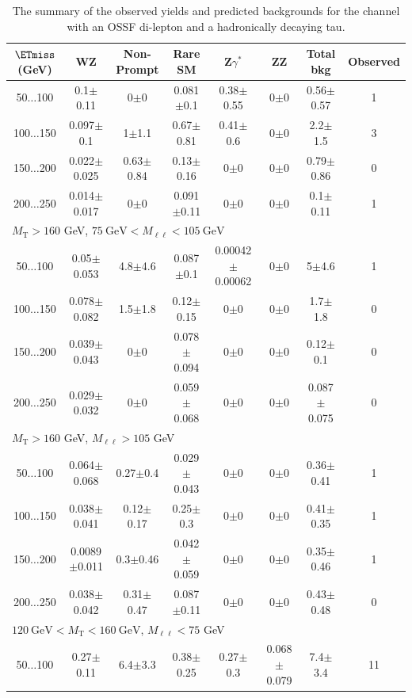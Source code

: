 \begin{table}
\scriptsize
\begin{center}
\caption{\label{tab:OSSF1tau1} The summary of the observed yields and predicted backgrounds for the channel 
with an OSSF di-lepton and a hadronically decaying tau. }
\begin{tabular}{| c | c c c c c c c | }\hline\hline
$\ETmiss$ (GeV) & WZ & Non-Prompt & Rare SM & Z$\gamma^*$ & ZZ & Total bkg & Observed\\\hline\hline
50$\dots$100&0.1$\pm$0.11&0$\pm$0&0.081$\pm$0.1&0.38$\pm$0.55&0$\pm$0&0.56$\pm$0.57&1\\
100$\dots$150&0.097$\pm$0.1&1$\pm$1.1&0.67$\pm$0.81&0.41$\pm$0.6&0$\pm$0&2.2$\pm$1.5&3\\
150$\dots$200&0.022$\pm$0.025&0.63$\pm$0.84&0.13$\pm$0.16&0$\pm$0&0$\pm$0&0.79$\pm$0.86&0\\
200$\dots$250&0.014$\pm$0.017&0$\pm$0&0.091$\pm$0.11&0$\pm$0&0$\pm$0&0.1$\pm$0.11&1\\
\hline\hline
\multicolumn{8}{l}{$M_{\text{T}} > 160$ GeV, $75~\mathrm{GeV} < M_{\ell\ell} < 105~\mathrm{GeV}$}\\\hline\hline
50$\dots$100&0.05$\pm$0.053&4.8$\pm$4.6&0.087$\pm$0.1&0.00042$\pm$0.00062&0$\pm$0&5$\pm$4.6&1\\
100$\dots$150&0.078$\pm$0.082&1.5$\pm$1.8&0.12$\pm$0.15&0$\pm$0&0$\pm$0&1.7$\pm$1.8&0\\
150$\dots$200&0.039$\pm$0.043&0$\pm$0&0.078$\pm$0.094&0$\pm$0&0$\pm$0&0.12$\pm$0.1&0\\
200$\dots$250&0.029$\pm$0.032&0$\pm$0&0.059$\pm$0.068&0$\pm$0&0$\pm$0&0.087$\pm$0.075&0\\
\hline\hline
\multicolumn{8}{l}{$M_{\text{T}} > 160$ GeV, $M_{\ell\ell} > 105$ GeV}\\\hline\hline
50$\dots$100&0.064$\pm$0.068&0.27$\pm$0.4&0.029$\pm$0.043&0$\pm$0&0$\pm$0&0.36$\pm$0.41&1\\
100$\dots$150&0.038$\pm$0.041&0.12$\pm$0.17&0.25$\pm$0.3&0$\pm$0&0$\pm$0&0.41$\pm$0.35&1\\
150$\dots$200&0.0089$\pm$0.011&0.3$\pm$0.46&0.042$\pm$0.059&0$\pm$0&0$\pm$0&0.35$\pm$0.46&1\\
200$\dots$250&0.038$\pm$0.042&0.31$\pm$0.47&0.087$\pm$0.11&0$\pm$0&0$\pm$0&0.43$\pm$0.48&0\\
\hline\hline
\multicolumn{8}{l}{$120~\mathrm{GeV} < M_{\text{T}} < 160~\mathrm{GeV}$, $M_{\ell\ell} < 75$ GeV}\\\hline\hline
50$\dots$100&0.27$\pm$0.11&6.4$\pm$3.3&0.38$\pm$0.25&0.27$\pm$0.3&0.068$\pm$0.079&7.4$\pm$3.4&11\\

\end{tabular}
\end{center}
\end{table}
